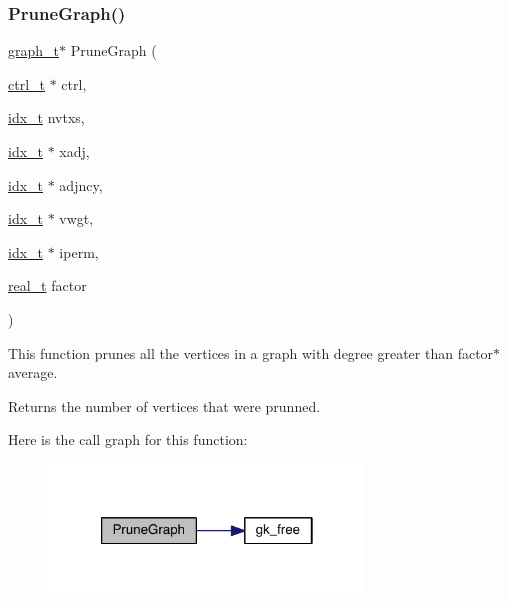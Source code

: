 \subsubsection{\texorpdfstring{Prune\+Graph()}{PruneGraph()}}
{\footnotesize\ttfamily \hyperlink{a00734}{graph\+\_\+t}$\ast$ Prune\+Graph (\begin{DoxyParamCaption}\item[{\hyperlink{a00742}{ctrl\+\_\+t} $\ast$}]{ctrl,  }\item[{\hyperlink{a00876_aaa5262be3e700770163401acb0150f52}{idx\+\_\+t}}]{nvtxs,  }\item[{\hyperlink{a00876_aaa5262be3e700770163401acb0150f52}{idx\+\_\+t} $\ast$}]{xadj,  }\item[{\hyperlink{a00876_aaa5262be3e700770163401acb0150f52}{idx\+\_\+t} $\ast$}]{adjncy,  }\item[{\hyperlink{a00876_aaa5262be3e700770163401acb0150f52}{idx\+\_\+t} $\ast$}]{vwgt,  }\item[{\hyperlink{a00876_aaa5262be3e700770163401acb0150f52}{idx\+\_\+t} $\ast$}]{iperm,  }\item[{\hyperlink{a00876_a1924a4f6907cc3833213aba1f07fcbe9}{real\+\_\+t}}]{factor }\end{DoxyParamCaption})}

This function prunes all the vertices in a graph with degree greater than factor$\ast$average.

\begin{DoxyReturn}{Returns}
the number of vertices that were prunned. 
\end{DoxyReturn}
Here is the call graph for this function\+:\nopagebreak
\begin{figure}[H]
\begin{center}
\leavevmode
\includegraphics[width=238pt]{a00185_afc11099daf13e5e24f17076daf471765_cgraph}
\end{center}
\end{figure}
